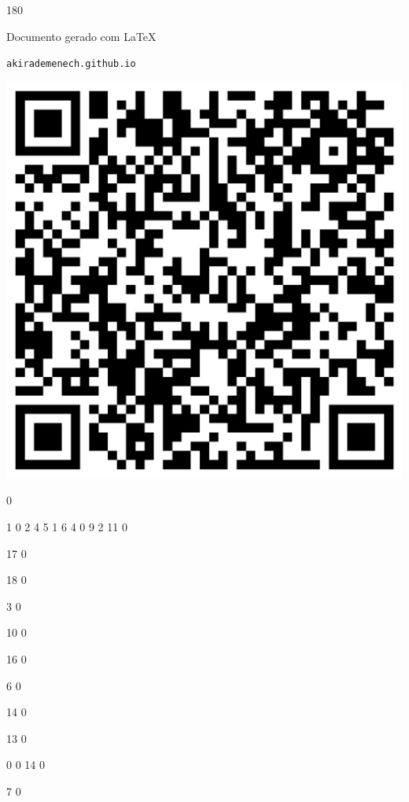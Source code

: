 \documentclass[12pt]{article}
\begin{document}
	\begin{turn}{180}	
		\begin{minipage}{\textwidth}		  
		  Documento gerado com \LaTeX			
		  
		  \texttt{akirademenech.github.io}

		  \includegraphics[height=0.3\textheight]{2e-2.pdf}

		\end{minipage}	
	\end{turn}  
		  
		\vfill  
		  
{
	0	%

	1	%
	0	%
	2	%
	4	%
	5	%
	1	%
	6	%
	4	%
	0	%
	9	%
	2	%
	11	%
	0	%

	17	%
	0	%

	18	%
	0	%

	3	%
	0	%

	10	%
	0	%

	16	%
	0	%

	6	%
	0	%

	14	%
	0	%

	13	%
	0	%

	0	%
	0	%
	14	%
	0	%

	7	%
	0	%

}	  
		    	
\end{document}
